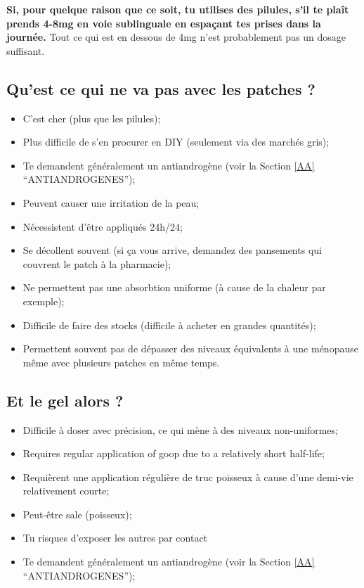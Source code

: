 \documentclass{article}
\begin{document}
\textbf{Si, pour quelque raison que ce soit, tu utilises des pilules, s'il te plaît prends 4-8mg en voie sublinguale en espaçant tes prises dans la journée.} Tout ce qui est en dessous de 4mg n'est probablement pas un dosage suffisant.

\subsection{Qu'est ce qui ne va pas avec les patches ?}

\begin{itemize}
  \item C'est cher (plus que les pilules);
  \item Plus difficile de s'en procurer en DIY (seulement via des marchés gris);
  \item Te demandent généralement un antiandrogène (voir la  Section \ref{AA} “ANTIANDROGENES”);
  \item Peuvent causer une irritation de la peau;
  \item Nécessistent d'être appliqués 24h/24;
  \item Se décollent souvent (si ça vous arrive, demandez des pansements qui couvrent le patch à la pharmacie);
  \item Ne permettent pas une absorbtion uniforme (à cause de la chaleur par exemple);
  \item Difficile de faire des stocks (difficile à acheter en grandes quantités);
  \item Permettent souvent pas de dépasser des niveaux équivalents à une ménopause même avec plusieurs patches en même temps.
\end{itemize}

\subsection{Et le gel alors ?}

\begin{itemize}
  \item Difficile à doser avec précision, ce qui mène à des niveaux non-uniformes;
  \item Requires regular application of goop due to a relatively short half-life;
  \item Requièrent une application régulière de truc poisseux à cause d'une demi-vie relativement courte;
  \item Peut-être sale (poisseux);
  \item Tu risques d'exposer les autres par contact
  \item Te demandent généralement un antiandrogène (voir la  Section \ref{AA} “ANTIANDROGENES”);
\end{itemize}
\end{document}
